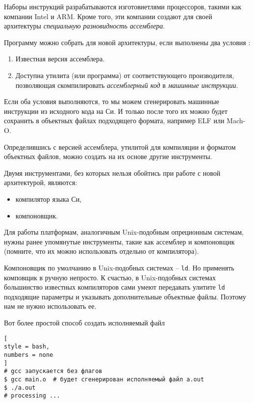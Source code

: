 \documentclass[%
	11pt,
	a4paper,
	utf8,
		]{article}
\begin{document}
Наборы инструкций разрабатываются изготовиетлями процессоров, такими как компании Intel и ARM. Кроме того, эти компании создают для своей архитектуры \emph{специальную разновидность ассемблера}.

Программу можно собрать для новой архитектуры, если выполнены два условия \cite[]{amini-extreme-c:2022}:
\begin{enumerate}
	\item Известная версия ассемблера.
	
	\item Доступна утилита (или программа) от соответствующего производителя, позволяющая скомпилировать \emph{ассемблерный код} в \emph{машинные инструкции}.
\end{enumerate}

Если оба условия выполняются, то мы можем сгенерировать машинные инструкции из исходного кода на Си. И только после того их можно будет сохранить в объектных файлах подходящего формата, например ELF или Mach-O.

Определившись с версией ассемблера, утилитой для компиляции и форматом объектных файлов, можно создать на их основе другие инструменты.

Двумя инструментами, без которых нельзя обойтись при работе с новой архитектурой, являются:
\begin{itemize}
	\item компилятор языка Си,
	
	\item компоновщик.
\end{itemize}

Для работы платформам, аналогичным Unix-подобным опреционным системам, нужны ранее упомянутые инструменты, такие как ассемблер и компоновщик (помните, что их можно использовать отдельно от компилятора).

Компоновщик по умолчанию в Unix-подобных системах -- \verb|ld|. Но применять комповщик в ручную непросто. К счастью, в Unix-подобных системах большинство известных компиляторов сами умеют передавать улитите \verb|ld| подходящие параметры и указывать дополнительные объектные файлы. Поэтому нам не нужно использовать ее.

Вот более простой способ создать исполняемый файл
\begin{lstlisting}[
style = bash,
numbers = none
]
# gcc запускается без флагов
$ gcc main.o  # будет сгенерирован исполняемый файл a.out
$ ./a.out
# processing ...
\end{lstlisting}
\end{document}
